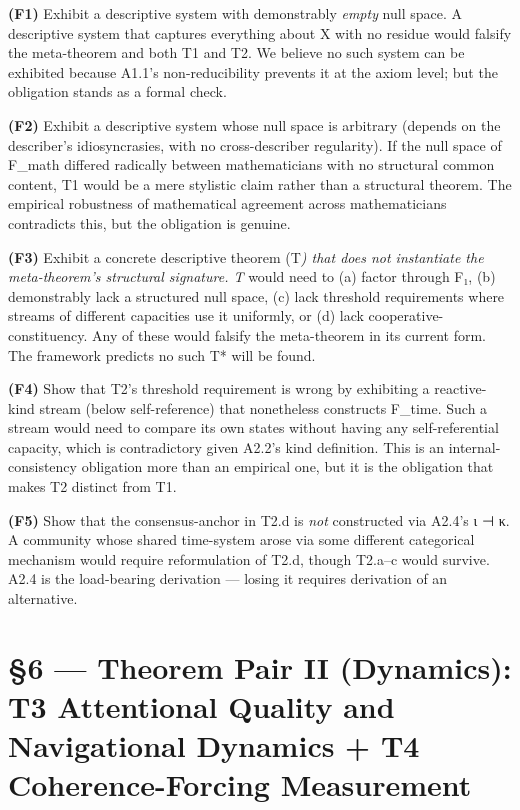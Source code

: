 \documentclass[11pt, openany]{book}
\begin{document}
\textbf{(F1)} Exhibit a descriptive system with demonstrably \textit{empty} null space. A descriptive system that captures everything about X with no residue would falsify the meta-theorem and both T1 and T2. We believe no such system can be exhibited because A1.1's non-reducibility prevents it at the axiom level; but the obligation stands as a formal check.

\textbf{(F2)} Exhibit a descriptive system whose null space is arbitrary (depends on the describer's idiosyncrasies, with no cross-describer regularity). If the null space of F\_\allowbreak{}math differed radically between mathematicians with no structural common content, T1 would be a mere stylistic claim rather than a structural theorem. The empirical robustness of mathematical agreement across mathematicians contradicts this, but the obligation is genuine.

\textbf{(F3)} Exhibit a concrete descriptive theorem (T\textit{) that does not instantiate the meta-theorem's structural signature. T} would need to (a) factor through F₁, (b) demonstrably lack a structured null space, (c) lack threshold requirements where streams of different capacities use it uniformly, or (d) lack cooperative-constituency. Any of these would falsify the meta-theorem in its current form. The framework predicts no such T* will be found.

\textbf{(F4)} Show that T2's threshold requirement is wrong by exhibiting a reactive-kind stream (below self-reference) that nonetheless constructs F\_\allowbreak{}time. Such a stream would need to compare its own states without having any self-referential capacity, which is contradictory given A2.2's kind definition. This is an internal-consistency obligation more than an empirical one, but it is the obligation that makes T2 distinct from T1.

\textbf{(F5)} Show that the consensus-anchor in T2.d is \textit{not} constructed via A2.4's ι ⊣ κ. A community whose shared time-system arose via some different categorical mechanism would require reformulation of T2.d, though T2.a–c would survive. A2.4 is the load-bearing derivation --- losing it requires derivation of an alternative.

\chapter{§6 — Theorem Pair II (Dynamics): T3 Attentional Quality and Navigational Dynamics + T4 Coherence-Forcing Measurement}
\end{document}
